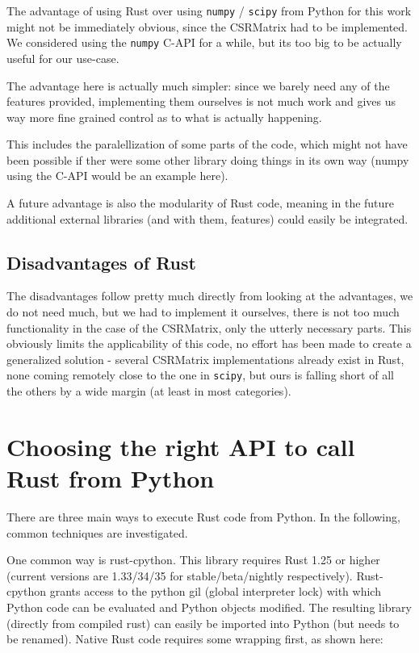 The advantage of using Rust over using \verb|numpy| / \verb|scipy| from Python
for this work might not be immediately obvious, since the CSRMatrix had to be
implemented. We considered using the \verb|numpy| C-API for a while, but its
too big to be actually useful for our use-case.

The advantage here is actually much simpler: since we barely need any of the
features provided, implementing them ourselves is not much work and gives us
way more fine grained control as to what is actually happening.

This includes the paralellization of some parts of the code, which might not
have been possible if ther were some other library doing things in its own way
(numpy using the C-API would be an example here).

A future advantage is also the modularity of Rust code, meaning in the future
additional external libraries (and with them, features) could easily be integrated.

\subsection{Disadvantages of Rust}

The disadvantages follow pretty much directly from looking at the advantages,
we do not need much, but we had to implement it ourselves, there is not
too much functionality in the case of the CSRMatrix, only the utterly necessary
parts. This obviously limits the applicability of this code, no effort has been
made to create a generalized solution - several CSRMatrix implementations
already exist in Rust, none coming remotely close to the one in \verb|scipy|,
but ours is falling short of all the others by a wide margin (at least in most
categories).



\section{Choosing the right API to call Rust from Python}\label{sec:api}

There are three main ways to execute Rust code from Python. In the following, common techniques are investigated.

One common way is rust-cpython. This library requires Rust 1.25 or higher
(current versions are 1.33/34/35 for stable/beta/nightly respectively).
Rust-cpython grants access to the python gil (global interpreter lock) with
which Python code can be evaluated and Python objects modified. The resulting
library (directly from compiled rust) can easily be imported into Python (but
needs to be renamed). Native Rust code requires some wrapping first, as shown
here:

